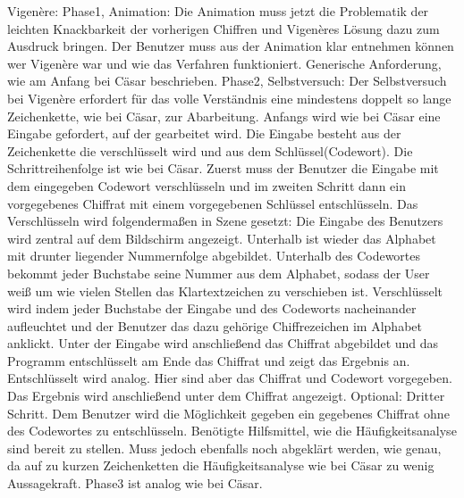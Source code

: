 \documentclass{article}
\begin{document}
Vigenère:
Phase1, Animation:
Die Animation muss jetzt die Problematik der leichten Knackbarkeit der vorherigen Chiffren und Vigenères Lösung dazu zum Ausdruck bringen. Der Benutzer muss aus der Animation klar entnehmen können wer Vigenère war und wie das Verfahren funktioniert.
Generische Anforderung, wie am Anfang bei Cäsar beschrieben.
Phase2, Selbstversuch:
Der Selbstversuch bei Vigenère erfordert für das volle Verständnis eine mindestens doppelt so lange Zeichenkette, wie bei Cäsar, zur Abarbeitung.
Anfangs wird wie bei Cäsar eine Eingabe gefordert, auf der gearbeitet wird. Die Eingabe besteht aus der Zeichenkette die verschlüsselt wird und aus dem Schlüssel(Codewort).
Die Schrittreihenfolge ist wie bei Cäsar. Zuerst muss der Benutzer die Eingabe mit dem eingegeben Codewort verschlüsseln und im zweiten Schritt dann ein vorgegebenes Chiffrat mit einem vorgegebenen Schlüssel entschlüsseln.
Das Verschlüsseln wird folgendermaßen in Szene gesetzt:
           Die Eingabe des Benutzers wird zentral auf dem Bildschirm angezeigt. Unterhalb ist wieder das Alphabet mit drunter liegender Nummernfolge abgebildet. Unterhalb des Codewortes bekommt jeder Buchstabe seine Nummer aus dem Alphabet, sodass der User weiß um wie vielen Stellen das Klartextzeichen zu verschieben ist. Verschlüsselt wird indem jeder Buchstabe der Eingabe und des Codeworts nacheinander aufleuchtet und der Benutzer das dazu gehörige Chiffrezeichen im Alphabet anklickt. Unter der Eingabe wird anschließend das Chiffrat abgebildet und das Programm entschlüsselt am Ende das Chiffrat und zeigt das Ergebnis an.
Entschlüsselt wird analog. Hier sind aber das Chiffrat und Codewort vorgegeben. Das Ergebnis wird anschließend unter dem Chiffrat angezeigt.
Optional:
Dritter Schritt. Dem Benutzer wird die Möglichkeit gegeben ein gegebenes Chiffrat ohne des Codewortes zu entschlüsseln. Benötigte Hilfsmittel, wie die Häufigkeitsanalyse sind bereit zu stellen. Muss jedoch ebenfalls noch abgeklärt werden, wie genau, da auf zu kurzen Zeichenketten die Häufigkeitsanalyse wie bei Cäsar zu wenig Aussagekraft.
Phase3 ist analog wie bei Cäsar.
\end{document}

